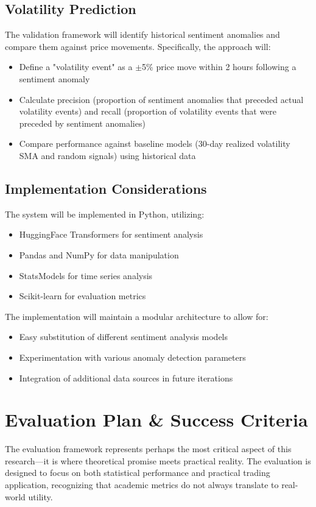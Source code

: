 \documentclass[11pt,twocolumn]{article}
\begin{document}
\subsection{\textbf{Volatility Prediction}}
The validation framework will identify historical sentiment anomalies and compare them against price movements. Specifically, the approach will:
\begin{itemize}
\item Define a "volatility event" as a $\pm$5\% price move within 2 hours following a sentiment anomaly
\item Calculate precision (proportion of sentiment anomalies that preceded actual volatility events) and recall (proportion of volatility events that were preceded by sentiment anomalies)
\item Compare performance against baseline models (30-day realized volatility SMA and random signals) using historical data
\end{itemize}

\subsection{\textbf{Implementation Considerations}}
The system will be implemented in Python, utilizing:
\begin{itemize}
\item HuggingFace Transformers for sentiment analysis
\item Pandas and NumPy for data manipulation
\item StatsModels for time series analysis
\item Scikit-learn for evaluation metrics
\end{itemize}

The implementation will maintain a modular architecture to allow for:
\begin{itemize}
\item Easy substitution of different sentiment analysis models
\item Experimentation with various anomaly detection parameters
\item Integration of additional data sources in future iterations
\end{itemize}

\section{Evaluation Plan \& Success Criteria}
The evaluation framework represents perhaps the most critical aspect of this research—it is where theoretical promise meets practical reality. The evaluation is designed to focus on both statistical performance and practical trading application, recognizing that academic metrics do not always translate to real-world utility.
\end{document}

